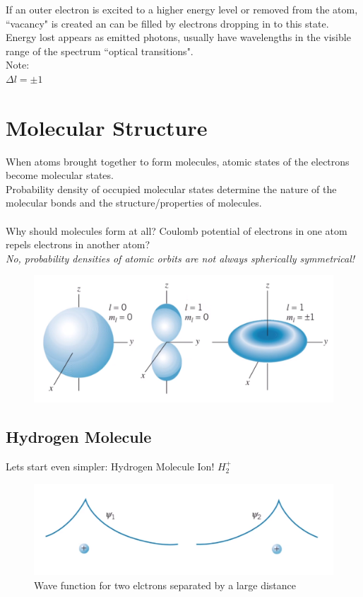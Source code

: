 \documentclass[class=article,crop=false]{standalone}
\begin{document}
If an outer electron is excited to a higher energy level or removed from the atom, ``vacancy" is created an can be filled by electrons dropping in to this state.\\
Energy lost appears as emitted photons, usually have wavelengths in the visible range of the spectrum ``optical transitions".\\
Note: \\
\emph{$\Delta l = \pm 1$}\\

\section{Molecular Structure}
When atoms brought together to form molecules, atomic states of the electrons 
become molecular states.\\
Probability density of occupied molecular states determine the nature of the 
molecular bonds and the structure/properties of molecules.\\
\\

Why should molecules form at all? Coulomb potential of electrons in one atom repels electrons in another atom? \\

\emph{No, probability densities of atomic orbits are not always spherically symmetrical!}

\begin{figure}[h!]
	\centering
	\includegraphics[width=.9\linewidth]{./Images/spherical.png}
	\caption{}
\end{figure}

\subsection{Hydrogen Molecule}
Lets start even simpler: Hydrogen Molecule Ion! $H_2^+$ \\

\begin{figure}[h!]
	\centering
	\includegraphics[width=.7\linewidth]{./Images/hydogen_molecule.png}
	\caption{Wave function for two elctrons separated by a large distance}
\end{figure}
\end{document}
